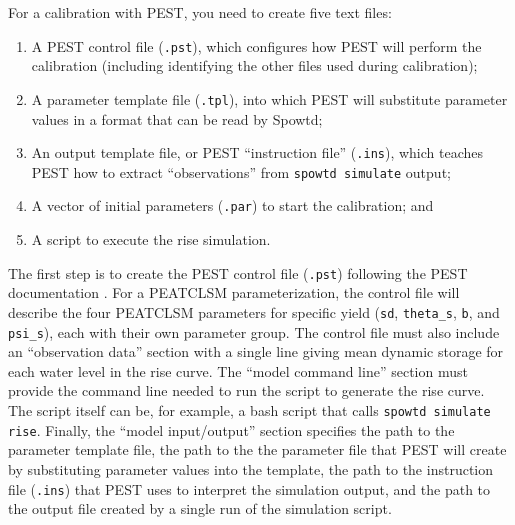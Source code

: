 \documentclass[11pt,a4paper]{article}
\begin{document}
For a calibration with PEST, you need to create five text files:
\begin{enumerate}
\item A PEST control file (\texttt{.pst}), which configures how PEST
  will perform the calibration (including identifying the other files
  used during calibration);
\item A parameter template file (\texttt{.tpl}), into which PEST will
  substitute parameter values in a format that can be read by Spowtd;
\item An output template file, or PEST ``instruction file''
  (\texttt{.ins}), which teaches PEST how to extract ``observations''
  from \texttt{spowtd simulate} output;
\item A vector of initial parameters (\texttt{.par}) to start the
  calibration; and
\item A script to execute the rise simulation.
\end{enumerate}

The first step is to create the PEST control file (\texttt{.pst})
following the PEST documentation \citep{Doherty_2010}.  For a PEATCLSM
parameterization, the control file will describe the four PEATCLSM
parameters for specific yield (\texttt{sd}, \texttt{theta\_s},
\texttt{b}, and \texttt{psi\_s}), each with their own parameter group.
The control file must also include an ``observation data'' section
with a single line giving mean dynamic storage for each water level in
the rise curve. The ``model command line'' section must provide the
command line needed to run the script to generate the rise curve.  The
script itself can be, for example, a bash script that calls
\texttt{spowtd simulate rise}.  Finally, the ``model input/output''
section specifies the path to the parameter template file, the path to
the the parameter file that PEST will create by substituting parameter
values into the template, the path to the instruction file
(\texttt{.ins}) that PEST uses to interpret the simulation output, and
the path to the output file created by a single run of the simulation
script.
\end{document}
